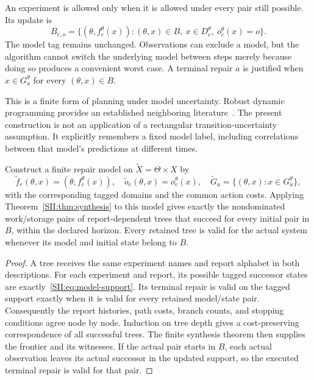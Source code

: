 An experiment is allowed only when it is allowed under every pair still possible. Its update is
\begin{equation}\label{SII:eq:model-support}
B_{e,o}=\{(\theta,f_e^\theta(x)):(\theta,x)\in B,\ x\in D_e^\theta,\ o_e^\theta(x)=o\}.
\end{equation}
The model tag remains unchanged. Observations can exclude a model, but the algorithm cannot switch the underlying model between steps merely because doing so produces a convenient worst case. A terminal repair $a$ is justified when $x\in G_a^\theta$ for every $(\theta,x)\in B$.

This is a finite form of planning under model uncertainty. Robust dynamic programming provides an established neighboring literature~\cite{SII:nilim}. The present construction is not an application of a rectangular transition-uncertainty assumption. It explicitly remembers a fixed model label, including correlations between that model's predictions at different times.

\begin{SIItheorem}\label{SII:thm:uncertain-synthesis}
Construct a finite repair model on $\widetilde X=\Theta\times X$ by
\[
\widetilde f_e(\theta,x)=(\theta,f_e^\theta(x)),\quad
\widetilde o_e(\theta,x)=o_e^\theta(x),\quad
\widetilde G_a=\{(\theta,x):x\in G_a^\theta\},
\]
with the corresponding tagged domains and the common action costs. Applying Theorem~\ref{SII:thm:synthesis} to this model gives exactly the nondominated work/storage pairs of report-dependent trees that succeed for every initial pair in $B$, within the declared horizon. Every retained tree is valid for the actual system whenever its model and initial state belong to $B$.
\end{SIItheorem}
\begin{proof}
A tree receives the same experiment names and report alphabet in both descriptions. For each experiment and report, its possible tagged successor states are exactly~\eqref{SII:eq:model-support}. Its terminal repair is valid on the tagged support exactly when it is valid for every retained model/state pair. Consequently the report histories, path costs, branch counts, and stopping conditions agree node by node. Induction on tree depth gives a cost-preserving correspondence of all successful trees. The finite synthesis theorem then supplies the frontier and its witnesses. If the actual pair starts in $B$, each actual observation leaves its actual successor in the updated support, so the executed terminal repair is valid for that pair.
\end{proof}

